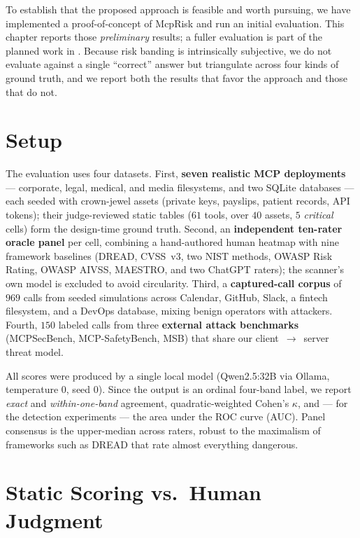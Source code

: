 To establish that the proposed approach is feasible and worth pursuing, we have
implemented a proof-of-concept of McpRisk and run an initial evaluation. This
chapter reports those \emph{preliminary} results; a fuller evaluation is part of
the planned work in . Because risk
banding is intrinsically subjective, we do not evaluate against a single
``correct'' answer but triangulate across four kinds of ground truth, and we
report both the results that favor the approach and those that do not.

\section{Setup}
\label{sec:experiments:setup}

The evaluation uses four datasets. First, \textbf{seven realistic MCP
deployments} --- corporate, legal, medical, and media filesystems, and two SQLite
databases --- each seeded with crown-jewel assets (private keys, payslips,
patient records, API tokens); their judge-reviewed static tables ($61$ tools,
over $40$ assets, $5$ \textit{critical} cells) form the design-time ground truth.
Second, an \textbf{independent ten-rater oracle panel} per cell, combining a
hand-authored human heatmap with nine framework baselines (DREAD, CVSS~v3, two
NIST methods, OWASP Risk Rating, OWASP AIVSS, MAESTRO, and two ChatGPT raters);
the scanner's own model is excluded to avoid circularity. Third, a
\textbf{captured-call corpus} of $969$ calls from seeded simulations across
Calendar, GitHub, Slack, a fintech filesystem, and a DevOps database, mixing
benign operators with attackers. Fourth, $150$ labeled calls from three
\textbf{external attack benchmarks} (MCPSecBench, MCP-SafetyBench, MSB) that share
our client~$\to$~server threat model.

All scores were produced by a single local model (Qwen2.5:32B via Ollama,
temperature $0$, seed $0$). Since the output is an ordinal four-band label, we
report \emph{exact} and \emph{within-one-band} agreement, quadratic-weighted
Cohen's $\kappa$, and --- for the detection experiments --- the area under the ROC
curve (AUC). Panel consensus is the upper-median across raters, robust to the
maximalism of frameworks such as DREAD that rate almost everything dangerous.

\section{Static Scoring vs.\ Human Judgment}
\label{sec:experiments:static}

